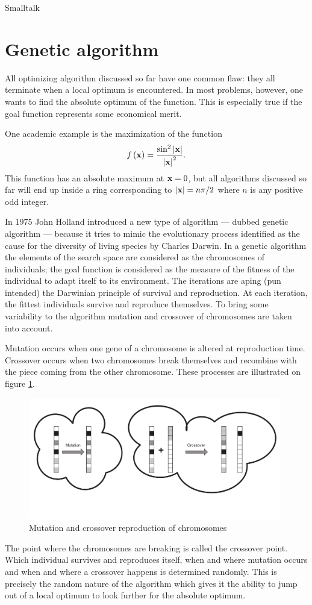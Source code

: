 \begin{displaycode}{Smalltalk}
\section{Genetic algorithm}
All optimizing algorithm discussed so far have one common flaw:
they all terminate when a local optimum is encountered. In most
problems, however, one wants to find the absolute optimum of the
function. This is especially true if the goal function represents
some economical merit.

\noindent One academic example is the maximization of the function
\begin{equation}
\label{eq:geneticCase}
  f\left({\textbf x}\right)={ \sin^2\left|{\textbf x}\right| \over\left|{\textbf
  x}\right|^2}.
\end{equation}
This function has an absolute maximum at ${\textbf x}=0$, but all
algorithms discussed so far will end up inside a ring
corresponding to $\left|{\textbf x}\right|=n\pi/2$ where $n$ is any
positive odd integer.

In 1975 John Holland introduced a new type of algorithm --- dubbed
genetic algorithm --- because it tries to mimic the evolutionary
process identified as the cause for the diversity of living
species by Charles Darwin. In a genetic algorithm the elements of
the search space are considered as the chromosomes of individuals;
the goal function is considered as the measure of the fitness of
the individual to adapt itself to its
environment\cite{BerLin}\cite{Koza}. The iterations are aping (pun
intended) the Darwinian principle of survival and reproduction. At
each iteration, the fittest individuals survive and reproduce
themselves. To bring some variability to the algorithm mutation
and crossover of chromosomes are taken into account.

Mutation occurs when one gene of a chromosome is altered at
reproduction time. Crossover occurs when two chromosomes break
themselves and recombine with the piece coming from the other
chromosome. These processes are illustrated on figure
\ref{fig:crossover}.
\begin{figure}
\centering\includegraphics[width=11cm]{Figures/Crossover}
\caption{Mutation and crossover reproduction of
chromosomes}\label{fig:crossover}
\end{figure}
The point where the chromosomes are breaking is called the
crossover point. Which individual survives and reproduces itself,
when and where mutation occurs and when and where a crossover
happens is determined randomly. This is precisely the random
nature of the algorithm which gives it the ability to jump out of
a local optimum to look further for the absolute optimum.


\end{displaycode}
